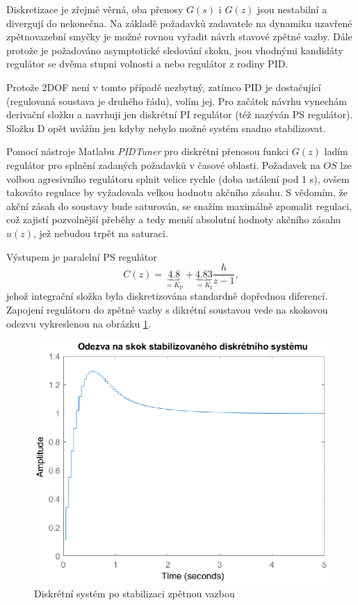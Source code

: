 \documentclass[twoside]{article}
\begin{document}
Diskretizace je zřejmě věrná,
oba přenosy $G(s)$ i $G(z)$ jsou nestabilní a divergují do nekonečna. Na základě požadavků zadavatele na dynamiku
uzavřené zpětnovazební smyčky je možné rovnou vyřadit návrh stavové zpětné vazby. Dále protože je požadováno
asymptotické sledování skoku, jsou vhodnými kandidáty regulátor se dvěma stupni volnosti a nebo regulátor z rodiny PID.


Protože 2DOF není v tomto případě nezbytný, zatímco PID je dostačující (regulovaná soustava je druhého řádu), volím jej.
Pro začátek návrhu vynechám derivační složku a navrhuji jen diskrétní PI regulátor (též nazýván PS regulátor).
Složku D opět uvážím jen kdyby nebylo možné systém snadno stabilizovat.

Pomocí nástroje Matlabu \textit{PIDTuner} pro diskrétní přenosou funkci $G(z)$ ladím regulátor pro splnění zadaných
požadavků v časové oblasti. Požadavek na $OS$ lze volbou agresivního regulátoru splnit velice rychle (doba ustálení pod 1 \si{\second}),
ovšem takováto regulace by vyžadovala velkou hodnotu akčního zásahu. S vědomím, že akční zásah do soustavy bude saturován, se snažím
maximálně zpomalit regulaci, což zajistí pozvolnější přeběhy a tedy menší absolutní hodnoty akčního zásahu $u(z)$, jež nebudou trpět na saturaci. 


Výstupem je paralelní PS regulátor
\begin{equation}
	C(z) = \underbrace{4.8}_{=K_\text{P}} + \underbrace{4.83}_{=K_\text{I}} \frac{h}{z-1},
\end{equation}
jehož integrační složka byla diskretizována standardně dopřednou diferencí.
Zapojení regulátoru do zpětné vazby s dikrétní soustavou vede na skokovou odezvu vykreslenou na obrázku \ref{fig:stabilizace}.

\begin{figure}[htbp]
	\centering
	\includegraphics[width=.8\linewidth]{stabilizovany_diskretni.eps}
	\caption{Diskrétní systém po stabilizaci zpětnou vazbou}
	\label{fig:stabilizace}
\end{figure}
\end{document}
